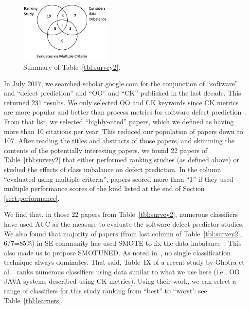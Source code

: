 \documentclass[sigconf]{acmart}
\theoremstyle{break}
\newcommand{\tion}[1]{{Section }\ref{sect:#1}}
\newcommand{\smb}{{\sc SMOTUNED}}
\begin{document}
 \begin{figure}
  \centering
  \captionsetup{justification=centering}
  \includegraphics[width=1.8in]{venn.png}
  \caption{Summary of  Table~\ref{tbl:survey2}.}
\label{fig:s2}
\vspace{-0.4cm}
\end{figure}
In July 2017,  we searched
scholar.google.com for the conjunction of ``software'' and ``defect prediction'' and ``OO'' and ``CK'' published in the last decade. This returned 231 results.
We only selected OO and CK keywords since CK metrics are more popular and better than process metrics for software defect prediction~\cite{radjenovic2013software}.
From that list, we selected ``highly-cited'' papers, which we defined as having more than 10 citations per year. This reduced our population of papers down to 107.
After reading the titles and abstracts of those papers, and skimming the contents of the potentially interesting papers, we found 22 papers of Table~\ref{tbl:survey2} that either performed ranking studies
(as defined above) or studied the effects of class imbalance on defect prediction. In the column ``evaluated using
multiple criteria'',
papers scored more than ``1'' if they used multiple performance scores  of the kind listed at the end of \tion{performance}. 


We find that, in those 22 papers from Table~\ref{tbl:survey2},
numerous classifiers have used AUC as the measure to evaluate the software defect
predictor studies. We also found that majority of papers (from last column of Table~\ref{tbl:survey2}, 6/7=85\%) in SE community has used SMOTE to fix the data imbalance~\cite{wang2013using,kamei2007effects,pelayo2007applying,tan2015online,pelayo2012evaluating,bennin2017mahakil}. This also made us to propose {\smb}. As
 noted in~\cite{lessmann2008benchmarking, ghotra2015revisiting},  no single classification technique always dominates.  
That said, Table~IX of a recent study by Ghotra et al.~\cite{ghotra2015revisiting} ranks
 numerous classifiers  using data similar
 to what we use here (i.e., OO JAVA systems described using CK metrics).
  Using their work, we can
select
 a range of classifiers  for this study
 ranking from ``best''
 to ``worst': see Table~\ref{tbl:learners}.
 
\end{document}

